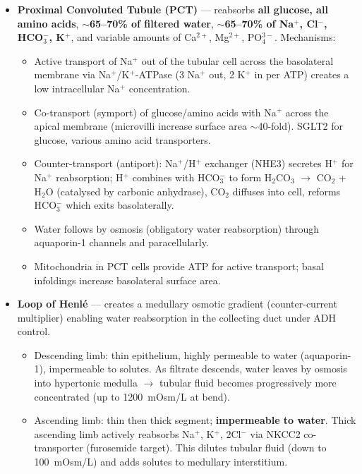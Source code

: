 \documentclass[11pt]{article}
\newcommand{\cle}[1]{{\popxbold\color{popdark}#1}}
\begin{document}
\begin{itemize}
\item \textbf{Proximal Convoluted Tubule (PCT)} — reabsorbs \textbf{all glucose, all amino acids}, \textbf{$\sim$65--70\% of filtered water}, \textbf{$\sim$65--70\% of Na$^+$, Cl$^-$, HCO$_3^-$, K$^+$}, and variable amounts of Ca$^{2+}$, Mg$^{2+}$, PO$_4^{3-}$. Mechanisms:
  \begin{itemize}
  \item \cle{Active transport} of Na$^+$ out of the tubular cell across the basolateral membrane via \cle{Na$^+$/K$^+$-ATPase} (3 Na$^+$ out, 2 K$^+$ in per ATP) creates a low intracellular Na$^+$ concentration.
  \item \cle{Co-transport (symport)} of glucose/amino acids with Na$^+$ across the apical membrane (microvilli increase surface area $\sim$40-fold). SGLT2 for glucose, various amino acid transporters.
  \item \cle{Counter-transport (antiport)}: Na$^+$/H$^+$ exchanger (NHE3) secretes H$^+$ for Na$^+$ reabsorption; H$^+$ combines with HCO$_3^-$ to form H$_2$CO$_3$ $\to$ CO$_2$ + H$_2$O (catalysed by carbonic anhydrase), CO$_2$ diffuses into cell, reforms HCO$_3^-$ which exits basolaterally.
  \item Water follows by \cle{osmosis} (obligatory water reabsorption) through aquaporin-1 channels and paracellularly.
  \item Mitochondria in PCT cells provide ATP for active transport; basal infoldings increase basolateral surface area.
  \end{itemize}
\item \textbf{Loop of Henlé} — creates a \cle{medullary osmotic gradient} (counter-current multiplier) enabling water reabsorption in the collecting duct under ADH control.
  \begin{itemize}
  \item \cle{Descending limb}: thin epithelium, highly permeable to water (aquaporin-1), impermeable to solutes. As filtrate descends, water leaves by osmosis into hypertonic medulla $\to$ tubular fluid becomes progressively more concentrated (up to \SI{1200}{mOsm/L} at bend).
  \item \cle{Ascending limb}: thin then thick segment; \textbf{impermeable to water}. Thick ascending limb actively reabsorbs Na$^+$, K$^+$, 2Cl$^-$ via \cle{NKCC2} co-transporter (furosemide target). This dilutes tubular fluid (down to \SI{100}{mOsm/L}) and adds solutes to medullary interstitium.
  \end{itemize}

\end{itemize}
\end{document}
